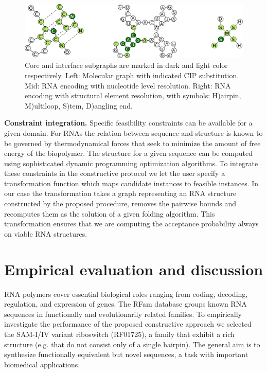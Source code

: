 \documentclass{article}
\begin{document}
\begin{figure}[ht]
      \centering
        \includegraphics[width=0.7\linewidth]{images/allcipsinone.png}
      \caption{
      Core and interface subgraphs are marked in dark and light color
      respectively. Left: Molecular graph with indicated CIP substitution.
      Mid: RNA encoding with nucleotide level resolution.  Right:  RNA encoding with structural element resolution, with symbols: H)airpin, M)ultiloop, S)tem, D)angling end.}
      \label{allcips}
\end{figure}


\textbf{Constraint integration.} Specific feasibility constraints can be
available for a given domain. For RNAs the relation between sequence and
structure is known to be governed by thermodynamical forces that seek to
minimize the amount of free energy of the biopolymer. The structure for a
given sequence can be computed using sophisticated dynamic programming
optimization algorithms. To integrate these constraints in the constructive
protocol we let the user specify a transformation function which maps
candidate instances to feasible instances. In our case the transformation
takes a graph representing an RNA structure constructed by the proposed
procedure, removes the pairwise bounds and recomputes them as the solution of
a given folding algorithm. This transformation ensures that we are computing
the acceptance probability always on viable RNA structures.


\section{Empirical evaluation and discussion}

RNA polymers cover essential biological roles ranging from coding, decoding,
regulation, and expression of genes. The RFam database \citep{rfam} groups
known RNA sequences in functionally and evolutionarily related families. To
empirically investigate the performance of the proposed constructive approach
we selected the SAM-I/IV variant riboswitch (RF01725), a family that exhibit a
rich structure (e.g. that do not consist only of a single hairpin). The
general aim is to synthesize functionally equivalent but novel sequences, a
task with important biomedical applications.
\end{document}
